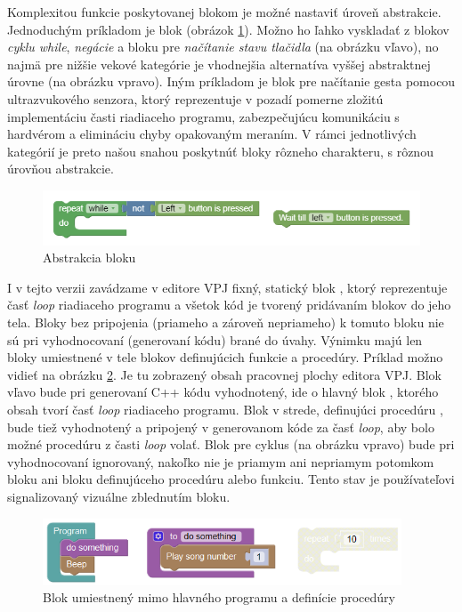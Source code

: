 Komplexitou funkcie poskytovanej blokom je možné nastaviť úroveň abstrakcie. Jednoduchým príkladom je blok  (obrázok \ref{obr:wait-till-couch}). Možno ho ľahko vyskladať z blokov \textit{cyklu while}, \textit{negácie} a bloku pre \textit{načítanie stavu tlačidla} (na obrázku vľavo), no najmä pre nižšie vekové kategórie je vhodnejšia alternatíva vyššej abstraktnej úrovne (na obrázku vpravo). Iným príkladom je blok pre načítanie gesta pomocou ultrazvukového senzora, ktorý reprezentuje v pozadí pomerne zložitú implementáciu časti riadiaceho programu, zabezpečujúcu komunikáciu s hardvérom a elimináciu chyby opakovaným meraním. V rámci jednotlivých kategórií je preto našou snahou poskytnúť bloky rôzneho charakteru, s rôznou úrovňou abstrakcie.


\begin{figure}
\centerline{\includegraphics[width=1\textwidth]{images/wait-till-couch}}
\caption[Abstrakcia bloku ]{Abstrakcia bloku }
\label{obr:wait-till-couch}
\end{figure}

I v tejto verzii zavádzame v editore VPJ fixný, statický blok , ktorý reprezentuje časť \textit{loop} riadiaceho programu a všetok kód je tvorený pridávaním blokov do jeho tela. Bloky bez pripojenia (priameho a zároveň nepriameho) k tomuto bloku nie sú pri vyhodnocovaní (generovaní kódu) brané do úvahy. Výnimku majú len bloky umiestnené v tele blokov definujúcich funkcie a procedúry. Príklad možno vidieť na obrázku \ref{obr:disabled-orphan-block}. Je tu zobrazený obsah pracovnej plochy editora VPJ. Blok vľavo bude pri generovaní C++ kódu vyhodnotený, ide o hlavný blok , ktorého obsah tvorí časť \textit{loop} riadiaceho programu. Blok v strede, definujúci procedúru , bude tiež vyhodnotený a pripojený v generovanom kóde za časť \textit{loop}, aby bolo možné procedúru z časti \textit{loop} volať. Blok pre cyklus (na obrázku vpravo) bude pri vyhodnocovaní ignorovaný, nakoľko nie je priamym ani nepriamym potomkom bloku  ani bloku definujúceho procedúru alebo funkciu. Tento stav je používateľovi signalizovaný vizuálne zblednutím bloku.

\begin{figure}
\centerline{\includegraphics[width=0.95\textwidth]{images/disabled-orphan-block}}
\caption[Blok umiestnený mimo hlavného programu a definície procedúry]{Blok umiestnený mimo hlavného programu a definície procedúry}
\label{obr:disabled-orphan-block}
\end{figure}


